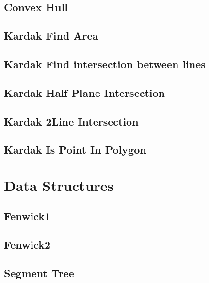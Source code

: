 \documentclass[a4paper,landscape]{article}
\begin{document}
\begin{multicols}{2}
\subsection{Convex Hull}
    
\subsection{Kardak Find Area}
	
\subsection{Kardak Find intersection between lines}
	
\subsection{Kardak Half Plane Intersection}
	
\subsection{Kardak 2Line Intersection}
	
\subsection{Kardak Is Point In Polygon}
	


\section{Data Structures}
\subsection{Fenwick1}
	
\subsection{Fenwick2}
	
\subsection{Segment Tree}
	

\end{multicols}
\end{document}
